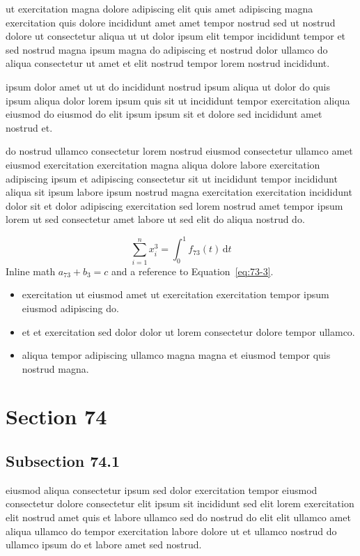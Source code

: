 \documentclass{article}
\begin{document}
ut exercitation magna dolore adipiscing elit quis amet adipiscing magna exercitation quis dolore incididunt amet amet tempor nostrud sed ut nostrud dolore ut consectetur aliqua ut ut dolor ipsum elit tempor incididunt tempor et sed nostrud magna ipsum magna do adipiscing et nostrud dolor ullamco do aliqua consectetur ut amet et elit nostrud tempor lorem nostrud incididunt.

ipsum dolor amet ut ut do incididunt nostrud ipsum aliqua ut dolor do quis ipsum aliqua dolor lorem ipsum quis sit ut incididunt tempor exercitation aliqua eiusmod do eiusmod do elit ipsum ipsum sit et dolore sed incididunt amet nostrud et.

do nostrud ullamco consectetur lorem nostrud eiusmod consectetur ullamco amet eiusmod exercitation exercitation magna aliqua dolore labore exercitation adipiscing ipsum et adipiscing consectetur sit ut incididunt tempor incididunt aliqua sit ipsum labore ipsum nostrud magna exercitation exercitation incididunt dolor sit et dolor adipiscing exercitation sed lorem nostrud amet tempor ipsum lorem ut sed consectetur amet labore ut sed elit do aliqua nostrud do.

\begin{equation}\label{eq:73-3}
  \sum_{i=1}^{n} x_i^{3} = \int_0^1 f_{73}(t)\,\mathrm{d}t
\end{equation}
Inline math $a_{73} + b_{3} = c$ and a reference to Equation~\eqref{eq:73-3}.

\begin{itemize}
  \item exercitation ut eiusmod amet ut exercitation exercitation tempor ipsum eiusmod adipiscing do.
  \item et et exercitation sed dolor dolor ut lorem consectetur dolore tempor ullamco.
  \item aliqua tempor adipiscing ullamco magna magna et eiusmod tempor quis nostrud magna.
\end{itemize}

\section{Section 74}\label{sec:74}
\subsection{Subsection 74.1}\label{sec:74-1}
eiusmod aliqua consectetur ipsum sed dolor exercitation tempor eiusmod consectetur dolore consectetur elit ipsum sit incididunt sed elit lorem exercitation elit nostrud amet quis et labore ullamco sed do nostrud do elit elit ullamco amet aliqua ullamco do tempor exercitation labore dolore ut et ullamco nostrud do ullamco ipsum do et labore amet sed nostrud.
\end{document}
